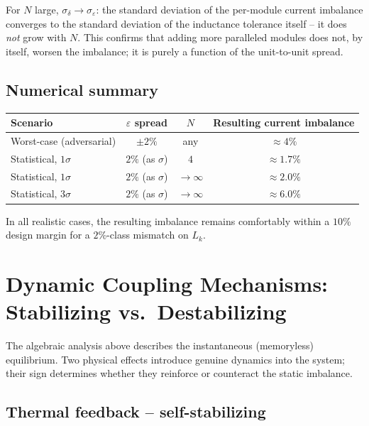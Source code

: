 \documentclass[11pt,a4paper]{article}
\begin{document}
For $N$ large, $\sigma_\delta \to \sigma_\varepsilon$: the standard deviation of the per-module current imbalance converges to the standard deviation of the inductance tolerance itself -- it does \emph{not} grow with $N$. This confirms that adding more paralleled modules does not, by itself, worsen the imbalance; it is purely a function of the unit-to-unit spread.

\subsection{Numerical summary}

\begin{center}
\begin{tabular}{@{}lccc@{}}
\toprule
Scenario & $\varepsilon$ spread & $N$ & Resulting current imbalance \\
\midrule
Worst-case (adversarial) & $\pm 2\%$ & any & $\approx 4\%$ \\
Statistical, $1\sigma$ & $2\%$ (as $\sigma$) & $4$ & $\approx 1.7\%$ \\
Statistical, $1\sigma$ & $2\%$ (as $\sigma$) & $\to\infty$ & $\approx 2.0\%$ \\
Statistical, $3\sigma$ & $2\%$ (as $\sigma$) & $\to\infty$ & $\approx 6.0\%$ \\
\bottomrule
\end{tabular}
\end{center}

In all realistic cases, the resulting imbalance remains comfortably within a $10\%$ design margin for a $2\%$-class mismatch on $L_k$.

\section{Dynamic Coupling Mechanisms: Stabilizing vs.\ Destabilizing}

The algebraic analysis above describes the instantaneous (memoryless) equilibrium. Two physical effects introduce genuine dynamics into the system; their sign determines whether they reinforce or counteract the static imbalance.

\subsection{Thermal feedback -- self-stabilizing}
\end{document}
